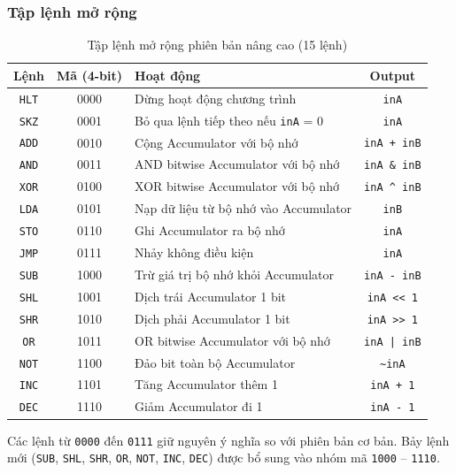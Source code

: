 \subsubsection{Tập lệnh mở rộng}
\begin{table}[H]
\centering
\begin{tabular}{|c|c|l|c|}
\hline
\textbf{Lệnh} & \textbf{Mã (4-bit)} & \textbf{Hoạt động} & \textbf{Output} \\
\hline
\texttt{HLT} & 0000 & Dừng hoạt động chương trình           & \texttt{inA} \\
\texttt{SKZ} & 0001 & Bỏ qua lệnh tiếp theo nếu \texttt{inA} = 0     & \texttt{inA} \\
\texttt{ADD} & 0010 & Cộng Accumulator với bộ nhớ            & \texttt{inA + inB} \\
\texttt{AND} & 0011 & AND bitwise Accumulator với bộ nhớ     & \texttt{inA \& inB} \\
\texttt{XOR} & 0100 & XOR bitwise Accumulator với bộ nhớ    & \texttt{inA \textasciicircum{} inB} \\
\texttt{LDA} & 0101 & Nạp dữ liệu từ bộ nhớ vào Accumulator & \texttt{inB} \\
\texttt{STO} & 0110 & Ghi Accumulator ra bộ nhớ              & \texttt{inA} \\
\texttt{JMP} & 0111 & Nhảy không điều kiện                  & \texttt{inA} \\
\hline
\texttt{SUB} & 1000 & Trừ giá trị bộ nhớ khỏi Accumulator  & \texttt{inA - inB} \\
\texttt{SHL} & 1001 & Dịch trái Accumulator 1 bit            & \texttt{inA << 1} \\
\texttt{SHR} & 1010 & Dịch phải Accumulator 1 bit            & \texttt{inA >> 1} \\
\texttt{OR}  & 1011 & OR bitwise Accumulator với bộ nhớ      & \texttt{inA | inB} \\
\texttt{NOT} & 1100 & Đảo bit toàn bộ Accumulator            & \texttt{\textasciitilde{}inA} \\
\texttt{INC} & 1101 & Tăng Accumulator thêm 1                & \texttt{inA + 1} \\
\texttt{DEC} & 1110 & Giảm Accumulator đi 1                  & \texttt{inA - 1} \\
\hline
\end{tabular}
\caption{Tập lệnh mở rộng phiên bản nâng cao (15 lệnh)}
\label{tab:isa_levelup}
\end{table}
Các lệnh từ \texttt{0000} đến \texttt{0111} giữ nguyên ý nghĩa so với phiên bản cơ bản. Bảy lệnh mới (\texttt{SUB}, \texttt{SHL}, \texttt{SHR}, \texttt{OR}, \texttt{NOT}, \texttt{INC}, \texttt{DEC}) được bổ sung vào nhóm mã \texttt{1000} – \texttt{1110}.